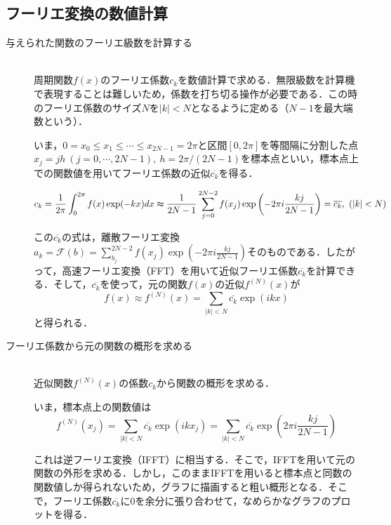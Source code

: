 \documentclass[11pt,a4paper,titlepage]{jsreport}
\theoremstyle{definition}
\begin{document}
\subsection{フーリエ変換の数値計算}
\begin{description}
  \item[与えられた関数のフーリエ級数を計算する]
    \quad\\
    周期関数$f(x)$のフーリエ係数$c_k$を数値計算で求める．無限級数を計算機で表現することは難しいため，係数を打ち切る操作が必要である．この時のフーリエ係数のサイズ$N$を$|k|<N$となるように定める（$N-1$を最大端数という）．

    いま，$0=x_0\leq x_1 \leq \cdots \leq x_{2N-1}=2\pi$と区間$[0,2\pi]$を等間隔に分割した点$x_j=jh\ (j=0,\cdots,2N-1),\ h=2\pi / (2N-1)$を標本点といい，標本点上での関数値を用いてフーリエ係数の近似$\overline{c_k}$を得る．

    \begin{equation*}
      c_k = \frac{1}{2\pi} \int_{0}^{2\pi} f(x) \exp(-kx) dx \thickapprox \frac{1}{2N-1} \sum_{j=0}^{2N-2} f(x_j) \exp\left(-2\pi i \frac{kj}{2N-1}\right) = \overline{c_k},\ (|k|<N)
    \end{equation*}

    この$\overline{c_k}$の式は，離散フーリエ変換$a_k=\mathcal{F}(b)=\sum_{b_j}^{2N-2} f(x_j) \exp\left(-2\pi i \frac{kj}{2N-1}\right)$そのものである．したがって，高速フーリエ変換（FFT）を用いて近似フーリエ係数$\overline{c_k}$を計算できる．そして，$\overline{c_k}$を使って，元の関数$f(x)$の近似$f^{(N)}(x)$が
    \begin{equation*}
      f(x) \approx f^{(N)}(x) = \sum_{|k|<N} \overline{c_k} \exp(ikx)
    \end{equation*}
    と得られる．

  \item[フーリエ係数から元の関数の概形を求める]
    \quad\\
    近似関数$f^{(N)}(x)$の係数$c_k$から関数の概形を求める．

    いま，標本点上の関数値は
    \begin{equation*}
      f^{(N)}(x_j) = \sum_{|k|<N} \overline{c_k} \exp(ikx_j) = \sum_{|k|<N} \overline{c_k} \exp\left(2\pi i \frac{kj}{2N-1}\right)
    \end{equation*}

    これは逆フーリエ変換（IFFT）に相当する．そこで，IFFTを用いて元の関数の外形を求める．しかし，このままIFFTを用いると標本点と同数の関数値しか得られないため，グラフに描画すると粗い概形となる．そこで，フーリエ係数$\overline{c_k}$に0を余分に張り合わせて，なめらかなグラフのプロットを得る．



\end{description}
\end{document}
